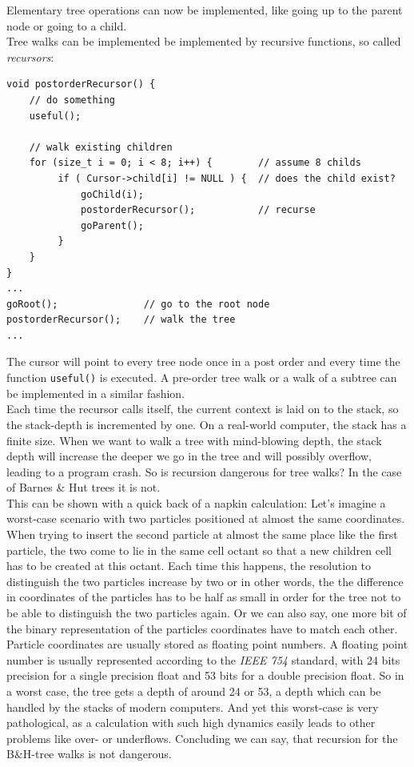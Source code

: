 Elementary tree operations can now be implemented, like going up to the parent node or going to a child.\\

Tree walks can be implemented be implemented by recursive functions, so called \emph{recursors}:
\begin{verbatim}
void postorderRecursor() {
    // do something
    useful();
    
    // walk existing children
    for (size_t i = 0; i < 8; i++) {        // assume 8 childs
         if ( Cursor->child[i] != NULL ) {  // does the child exist?
             goChild(i);
             postorderRecursor();           // recurse
             goParent();
         }
    }
}
...
goRoot();               // go to the root node
postorderRecursor();    // walk the tree
...
\end{verbatim}

The cursor will point to every tree node once in a post order and every time the function \verb|useful()| is executed. A pre-order tree walk or a walk of a subtree can be implemented in a similar fashion.\\

Each time the recursor calls itself, the current context is laid on to the stack, so the stack-depth is incremented by one. On a real-world computer, the stack has a finite size. When we want to walk a tree with mind-blowing depth, the stack depth will increase the deeper we go in the tree and will possibly overflow, leading to a program crash. So is recursion dangerous for tree walks? In the case of Barnes \& Hut trees it is not.\\

This can be shown with a quick back of a napkin calculation: Let's imagine a worst-case scenario with two particles positioned at almost the same coordinates. When trying to insert the second particle at almost the same place like the first particle, the two come to lie in the same cell octant so that a new children cell has to be created at this octant. Each time this happens, the resolution to distinguish the two particles increase by two or in other words, the the difference in coordinates of the particles has to be half as small in order for the tree not to be able to distinguish the two particles again. Or we can also say, one more bit of the binary representation of the particles coordinates have to match each other. Particle coordinates are usually stored as floating point numbers. A floating point number is usually represented according to the \emph{IEEE 754} standard, with 24 bits precision for a single precision float and 53 bits for a double precision float. So in a worst case, the tree gets a depth of around 24 or 53, a depth which can be handled by the stacks of modern computers. And yet this worst-case is very pathological, as a calculation with such high dynamics easily leads to other problems like over- or underflows. Concluding we can say, that recursion for the B\&H-tree walks is not dangerous.

